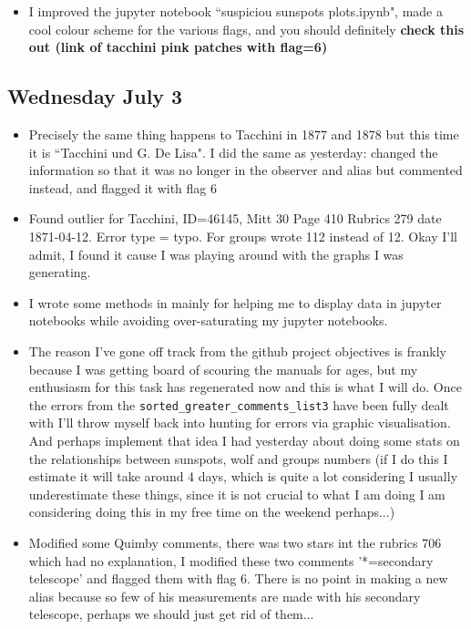 \documentclass[12pt]{article}
\begin{document}
\begin{itemize}
\item I improved the jupyter notebook ``suspiciou sunspots plots.ipynb", made a cool colour scheme for the various flags, and you should definitely \textbf{check this out (link of tacchini pink patches with flag=6)}
\end{itemize}
    
\subsection{Wednesday July 3}\label{wed 3 jul}
\begin{itemize}
    \item Precisely the same thing happens to Tacchini in 1877 and 1878 but this time it is ``Tacchini und G. De Lisa". I did the same as yesterday: changed the information so that it was no longer in the observer and alias but commented instead, and flagged it with flag 6
    \item Found outlier for Tacchini, ID=46145, Mitt 30 Page 410 Rubrics 279 date 1871-04-12. Error type = typo. For groups wrote 112 instead of 12. Okay I'll admit, I found it cause I was playing around with the graphs I was generating. 
    \item I wrote some methods in  mainly for helping me to display data in jupyter notebooks while avoiding over-saturating my jupyter notebooks.
    \item The reason I've gone off track from the github project objectives is frankly because I was getting board of scouring the manuals for ages, but my enthusiasm for this task has regenerated now and this is what I will do. Once the errors from the \texttt{sorted\_greater\_comments\_list3} have been fully dealt with I'll throw myself back into hunting for errors via graphic visualisation. And perhaps implement that idea I had yesterday about doing some stats on the relationships between sunspots, wolf and groups numbers (if I do this I estimate it will take around 4 days, which is quite a lot considering I usually underestimate these things, since it is not crucial to what I am doing I am considering doing this in my free time on the weekend perhaps...)
    \item Modified some Quimby comments, there was two stars int the rubrics 706 which had no explanation, I modified these two comments '*=secondary telescope' and flagged them with flag 6. There is no point in making a new alias because so few of his measurements are made with his secondary telescope, perhaps we should just get rid of them...

\end{itemize}
\end{document}
